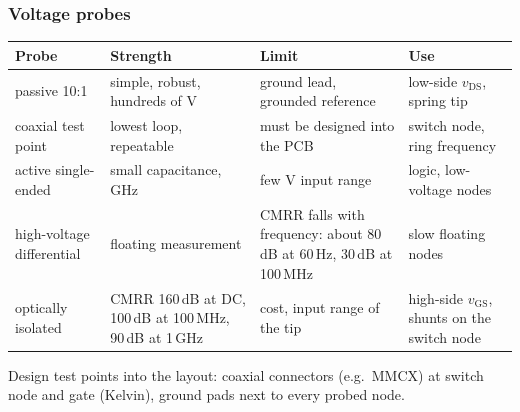 \begin{frame}
	\frametitle{Voltage probes}
	\begin{table}
		\centering
		\footnotesize
		\begin{tabular}{|l|>{\raggedright\arraybackslash}p{3.4cm}|>{\raggedright\arraybackslash}p{4.2cm}|>{\raggedright\arraybackslash}p{2.9cm}|}
			\hline
			\textbf{Probe}                 & \textbf{Strength}                                  & \textbf{Limit}                                                   & \textbf{Use}                       \\
			\hline
			passive 10:1                   & simple, robust, hundreds of V                      & ground lead, grounded reference                                   & low-side $v_\mathrm{DS}$, spring tip \\
			coaxial test point             & lowest loop, repeatable                            & must be designed into the PCB                                     & switch node, ring frequency        \\
			active single-ended            & small capacitance, GHz                             & few V input range                                                 & logic, low-voltage nodes           \\
			high-voltage differential      & floating measurement                               & CMRR falls with frequency: about 80\,dB at 60\,Hz, 30\,dB at 100\,MHz & slow floating nodes             \\
			optically isolated             & CMRR 160\,dB at DC, 100\,dB at 100\,MHz, 90\,dB at 1\,GHz & cost, input range of the tip                             & high-side $v_\mathrm{GS}$, shunts on the switch node \\
			\hline
		\end{tabular}
	\end{table}
	\small
	Design test points into the layout: coaxial connectors (e.g.\ MMCX) at switch node and gate (Kelvin), ground pads next to every probed node.
\end{frame}

